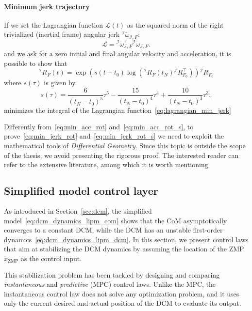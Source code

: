 \paragraph{Minimum jerk trajectory}
If we set the Lagrangian function $\mathcal{L}(t)$ as the squared norm of the right trivialized (inertial frame) angular jerk ${}^\mathcal{I} \ddot{\omega}_{\mathcal{I}, F}$:
\begin{equation}
    \label{eq:lagrangian_min_jerk}
    \mathcal{L} = {}^\mathcal{I} \ddot{\omega}_{\mathcal{I}, F}^\top {}^\mathcal{I} \ddot{\omega}_{\mathcal{I}, F}.
\end{equation}
and we ask for a zero initial and final angular velocity and acceleration, 
it is possible to show that  
\begin{equation}
    \label{eq:min_jerk_rot}
    {}^\mathcal{I}R_F(t) = \exp{\left(s(t-t_0) \log\left( {}^\mathcal{I}R_F(t_N) {}^\mathcal{I}R_{F_0}^\top  \right)\right)} {}^\mathcal{I}R_{F_0}
\end{equation}
where $s(\tau)$ is given by
\begin{equation}
\label{eq:min_jerk_rot_s}
    s(\tau) = \frac{6}{(t_N - t_0)^5} \tau^5 - \frac{15}{(t_N - t_0)^4} \tau^4 + \frac{10}{(t_N - t_0)^3} \tau^3,
\end{equation}
minimizes the integral of the Lagrangian function~\eqref{eq:lagrangian_min_jerk}~\citep{Liu2017Minimum-jerkActuator,Zefran1999MetricsKinematics}
\par
Differently from~\eqref{eq:min_acc_rot} and~\eqref{eq:min_acc_rot_s}, to prove~\eqref{eq:min_jerk_rot} and~\eqref{eq:min_jerk_rot_s} we need to exploit the mathematical tools of \emph{Differential Geometry}. Since this topic is outside the scope of the thesis, we avoid presenting the rigorous proof. The interested reader can refer to the extensive literature, among which it is worth mentioning~\citep{Zefran1999MetricsKinematics,Zefran1998OnMotions,Pressley2010ElementaryGeometry,Needham2021VisualForms,Selig2007CurvesSE3,Dubrovin1984ModernApplications}





\subsection{Simplified model control layer}

As introduced in Section~\ref{sec:dcm}, the simplified model~\eqref{eq:dcm_dynamics_lipm_com} shows that the CoM asymptotically converges to a constant DCM, while the DCM has an unstable first-order dynamics~\eqref{eq:dcm_dynamics_lipm_dcm}. In this section, we present control laws that aim at stabilizing the DCM dynamics by assuming the location of the ZMP $x_\text{ZMP}$ as the control input.
\par
This stabilization problem has been tackled by designing and comparing \emph{instantaneous} and \emph{predictive} (MPC) control laws.
Unlike the MPC, the instantaneous control law does not solve any optimization problem, and it uses only the current desired and actual position of the DCM to evaluate its output.
\par

